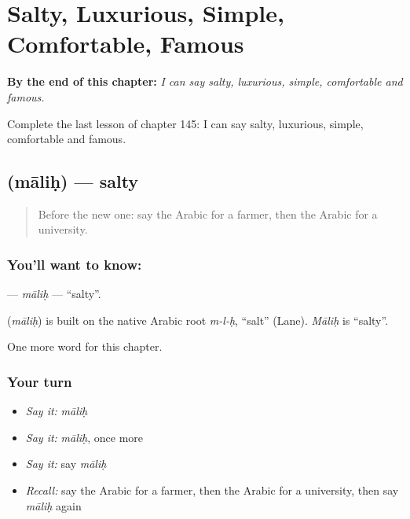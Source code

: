 
\chapter{Salty, Luxurious, Simple, Comfortable, Famous}
\label{ch:ar-salty-luxurious-simple-comfortable-famous}

\begin{chapteropening}
\textbf{By the end of this chapter:} \emph{I can say salty, luxurious, simple, comfortable and famous.}

Complete the last lesson of chapter 145: I can say salty, luxurious, simple, comfortable and famous.
\end{chapteropening}

\section[\texorpdfstring{\ar{مالح} (māliḥ)}{مالح (māliḥ)}]{ (māliḥ) — salty}

\label{lesson:AR-C145-malih}



\begin{quote}
Before the new one: say the Arabic for a farmer, then the Arabic for a university.
\end{quote}

\subsection*{You'll want to know: }
\textbf{} — \emph{māliḥ} — \textquotedblleft{}salty\textquotedblright{}.

\begin{cousinweb}
\textbf{} (\emph{māliḥ}) is built on the native Arabic root \emph{m-l-ḥ}, \textquotedblleft{}salt\textquotedblright{} (Lane). \emph{Māliḥ} is \textquotedblleft{}salty\textquotedblright{}.
\end{cousinweb}

\begin{grammarlens}[title={What you've built}]
One more word for this chapter.
\end{grammarlens}

\subsection*{Your turn}
\begin{itemize}
\raggedright
  \item \emph{Say it:} \emph{māliḥ}
  \item \emph{Say it:} \emph{māliḥ}, once more
  \item \emph{Say it:} say \emph{māliḥ}
  \item \emph{Recall:} say the Arabic for a farmer, then the Arabic for a university, then say \emph{māliḥ} again
\end{itemize}

